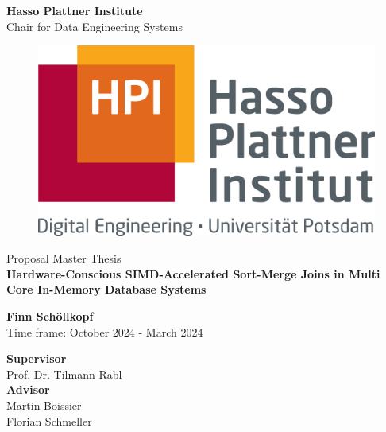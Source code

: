 \documentclass[a4paper, titlepage, 12pt]{article}
\newcommand{\thesisTitle}{Hardware-Conscious SIMD-Accelerated Sort-Merge Joins in Multi Core In-Memory Database Systems}
\newcommand{\name}{Finn Schöllkopf}
\newcommand{\timeFrame}{October 2024 - March 2024}
\newcommand{\supervisor}{Prof. Dr. Tilmann Rabl}
\newcommand{\advisor}{Martin Boissier \\ Florian Schmeller}
\newcommand{\thesisType}{Master}
\begin{document}
\begin{titlepage}
\begin{center}
\LARGE{\textbf{Hasso Plattner Institute}}\\
\normalsize{Chair for Data Engineering Systems}\\[0.3cm]

\begin{figure}[h!]
    \centering
    \includegraphics[width=.3\linewidth]{images/hpi_logo.jpg}
\end{figure}
\vspace{1cm}

\LARGE{Proposal {\thesisType} Thesis}\\[0.7cm]
\LARGE{\textbf{\thesisTitle}}

\vspace{1cm} 

\Large{\textbf{\name}} \\[3pt]  
\vspace{0.5cm}
\large{Time frame: \timeFrame} \\ 

\vspace{1cm}

\large{\textbf{Supervisor}}\\
\supervisor\\
\vspace{0.5cm}
\textbf{Advisor}\\
\advisor\\
\end{center}
\end{titlepage}







\clearpage

{\small 

}
\end{document}
